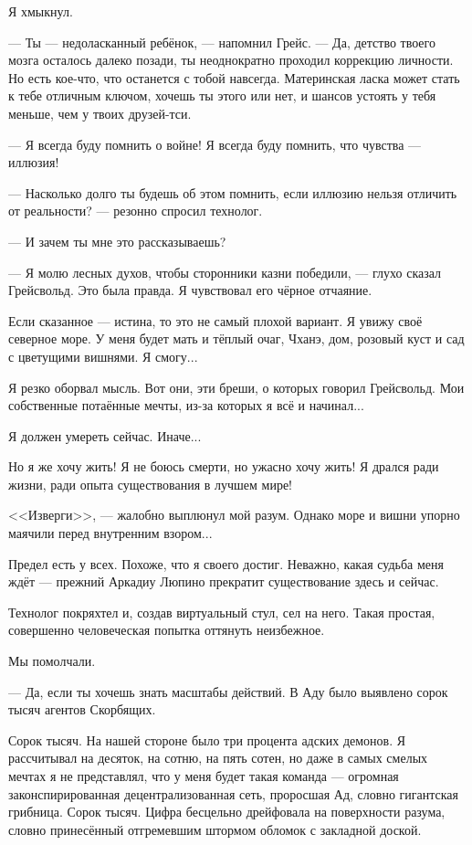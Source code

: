 Я хмыкнул.

--- Ты --- недоласканный ребёнок, --- напомнил Грейс.
--- Да, детство твоего мозга осталось далеко позади, ты неоднократно проходил коррекцию личности.
Но есть кое-что, что останется с тобой навсегда.
Материнская ласка может стать к тебе отличным ключом, хочешь ты этого или нет, и шансов устоять у тебя меньше, чем у твоих друзей-тси.

--- Я всегда буду помнить о войне!
Я всегда буду помнить, что чувства --- иллюзия!

--- Насколько долго ты будешь об этом помнить, если иллюзию нельзя отличить от реальности? --- резонно спросил технолог.

--- И зачем ты мне это рассказываешь?

--- Я молю лесных духов, чтобы сторонники казни победили, --- глухо сказал Грейсвольд.
Это была правда.
Я чувствовал его чёрное отчаяние.

Если сказанное --- истина, то это не самый плохой вариант.
Я увижу своё северное море.
У меня будет мать и тёплый очаг, Чханэ, дом, розовый куст и сад с цветущими вишнями.
Я смогу...

Я резко оборвал мысль.
Вот они, эти бреши, о которых говорил Грейсвольд.
Мои собственные потаённые мечты, из-за которых я всё и начинал...

Я должен умереть сейчас.
Иначе...

Но я же хочу жить!
Я не боюсь смерти, но ужасно хочу жить!
Я дрался ради жизни, ради опыта существования в лучшем мире!

<<Изверги>>, --- жалобно выплюнул мой разум.
Однако море и вишни упорно маячили перед внутренним взором...

Предел есть у всех.
Похоже, что я своего достиг.
Неважно, какая судьба меня ждёт --- прежний Аркадиу Люпино прекратит существование здесь и сейчас.

Технолог покряхтел и, создав виртуальный стул, сел на него.
Такая простая, совершенно человеческая попытка оттянуть неизбежное.

Мы помолчали.

--- Да, если ты хочешь знать масштабы действий.
В Аду было выявлено сорок тысяч агентов Скорбящих.

Сорок тысяч.
На нашей стороне было три процента адских демонов.
Я рассчитывал на десяток, на сотню, на пять сотен, но даже в самых смелых мечтах я не представлял, что у меня будет такая команда --- огромная законспирированная децентрализованная сеть, проросшая Ад, словно гигантская грибница.
Сорок тысяч.
Цифра бесцельно дрейфовала на поверхности разума, словно принесённый отгремевшим штормом обломок с закладной доской.


